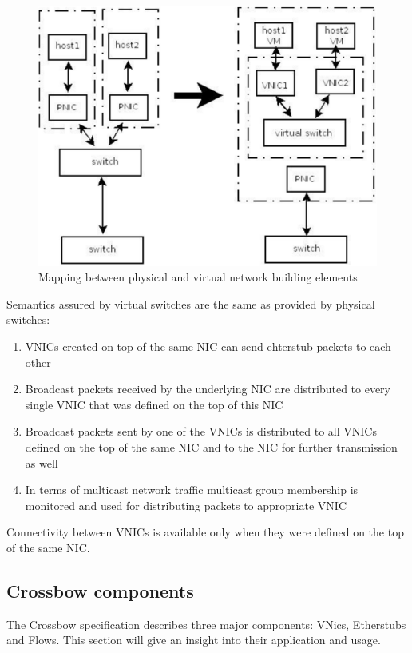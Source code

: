 \documentclass[11pt]{book}
\begin{document}
			\begin{figure}[H]
				\begin{center}
          \includegraphics[width=.7\textwidth]{img/physical_and_virtual_switches_mapping.pdf}
				\end{center}

				\caption{Mapping between physical and virtual network building elements}
			\end{figure}
			
			Semantics assured by virtual switches are the same as provided by physical switches: 
			\begin{enumerate}
				\item VNICs created on top of the same NIC can send ehterstub packets to each other
				\item Broadcast packets received by the underlying NIC are distributed to every single VNIC that was defined on the top of this NIC
				\item Broadcast packets sent by one of the VNICs is distributed to all VNICs defined on the top of the same NIC and to the NIC for further transmission as well
				\item In terms of multicast network traffic multicast group membership is monitored and used for distributing packets to appropriate VNIC
			\end{enumerate}

			Connectivity between VNICs is available only when they were defined on the top of the same NIC. 

	
      \subsection{Crossbow components}

                The Crossbow specification describes three major components: VNics, Etherstubs and Flows. This section
                will give an insight into their application and usage.
                
\end{document}
